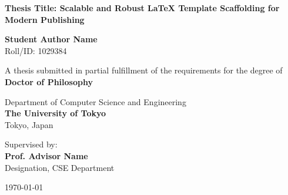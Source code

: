 \begin{titlepage}
\begin{center}
    \vspace*{1cm}
    
    
    \vspace{1.5cm}
    
    {\huge \bfseries \color{primary} Thesis Title: Scalable and Robust LaTeX Template Scaffolding for Modern Publishing}
    
    \vspace{1.5cm}
    
    {\Large \bfseries Student Author Name} \\
    \vspace{0.2cm}
    {Roll/ID: 1029384}
    
    \vspace{1.5cm}
    
    {A thesis submitted in partial fulfillment of the requirements for the degree of} \\
    \vspace{0.3cm}
    {\large \bfseries \color{secondary} Doctor of Philosophy}
    
    \vspace{1.5cm}
    
    {\large Department of Computer Science and Engineering} \\
    \vspace{0.2cm}
    {\large \bfseries \color{primary} The University of Tokyo} \\
    \vspace{0.1cm}
    {Tokyo, Japan}
    
    \vfill
    
    {Supervised by:} \\
    {\large \bfseries Prof. Advisor Name} \\
    {Designation, CSE Department}
    
    \vspace{1cm}
    
    {\large \today}
    
\end{center}
\end{titlepage}
